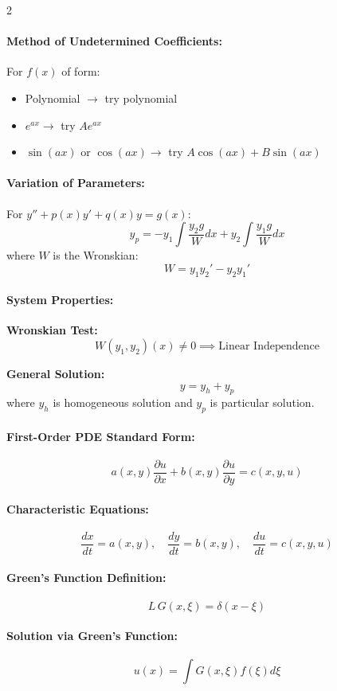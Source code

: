 \begin{multicols}{2}
\paragraph{Method of Undetermined Coefficients:}
For $f(x)$ of form:
\begin{itemize}
    \item Polynomial $\rightarrow$ try polynomial
    \item $e^{ax}\rightarrow$ try $Ae^{ax}$
    \item $\sin(ax)$ or $\cos(ax)\rightarrow$ try $A\cos(ax) + B\sin(ax)$
\end{itemize}

\paragraph{Variation of Parameters:}
For $y'' + p(x)y' + q(x)y = g(x)$:
\[
y_p = -y_1\int\frac{y_2g}{W}dx + y_2\int\frac{y_1g}{W}dx
\]
where $W$ is the Wronskian:
\[
W = y_1y_2' - y_2y_1'
\]

\paragraph{System Properties:}
\textbf{Wronskian Test:}
\[
W(y_1,y_2)(x) \neq 0 \implies \text{Linear Independence}
\]

\textbf{General Solution:}
\[
y = y_h + y_p
\]
where $y_h$ is homogeneous solution and $y_p$ is particular solution.

\paragraph{First-Order PDE Standard Form:}
\[
a(x,y)\frac{\partial u}{\partial x} + b(x,y)\frac{\partial u}{\partial y} = c(x,y,u)
\]

\paragraph{Characteristic Equations:}
\[
\frac{dx}{dt} = a(x,y), \quad \frac{dy}{dt} = b(x,y), \quad \frac{du}{dt} = c(x,y,u)
\]

\paragraph{Green's Function Definition:}
\[
L\,G(x,\xi) = \delta(x-\xi)
\]

\paragraph{Solution via Green's Function:}
\[
u(x) = \int G(x,\xi)f(\xi)d\xi
\]


\end{multicols}
